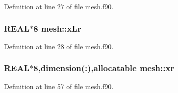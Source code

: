 Definition at line 27 of file mesh.f90.

\hypertarget{namespacemesh_a4ad69b5cc7ea5c0bd0f1f8d39fc3f604}{
\subsubsection[{xLr}]{\setlength{\rightskip}{0pt plus 5cm}REAL$\ast$8 {\bf mesh::xLr}}}
\label{namespacemesh_a4ad69b5cc7ea5c0bd0f1f8d39fc3f604}


Definition at line 28 of file mesh.f90.

\hypertarget{namespacemesh_a0351493d48c86a4a92f34aa94f8cc099}{
\subsubsection[{xr}]{\setlength{\rightskip}{0pt plus 5cm}REAL$\ast$8,dimension(:),allocatable {\bf mesh::xr}}}
\label{namespacemesh_a0351493d48c86a4a92f34aa94f8cc099}


Definition at line 57 of file mesh.f90.

